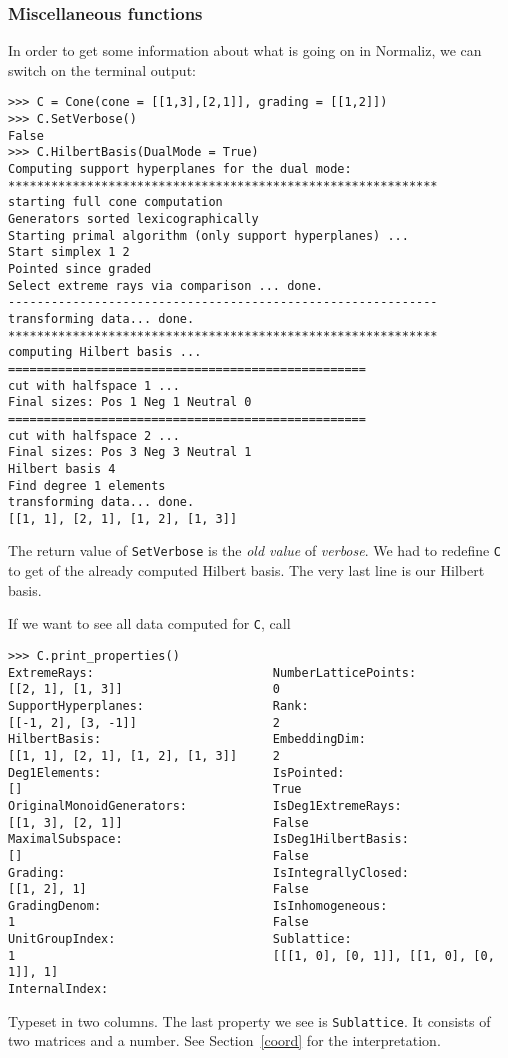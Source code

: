\begin{small}
\subsubsection{Miscellaneous functions}
In order to get some information about what is going on in Normaliz, we can switch on the terminal output:
\begin{Verbatim}
>>> C = Cone(cone = [[1,3],[2,1]], grading = [[1,2]])
>>> C.SetVerbose()
False
>>> C.HilbertBasis(DualMode = True)
Computing support hyperplanes for the dual mode:
************************************************************
starting full cone computation
Generators sorted lexicographically
Starting primal algorithm (only support hyperplanes) ...
Start simplex 1 2 
Pointed since graded
Select extreme rays via comparison ... done.
------------------------------------------------------------
transforming data... done.
************************************************************
computing Hilbert basis ...
==================================================
cut with halfspace 1 ...
Final sizes: Pos 1 Neg 1 Neutral 0
==================================================
cut with halfspace 2 ...
Final sizes: Pos 3 Neg 3 Neutral 1
Hilbert basis 4
Find degree 1 elements
transforming data... done.
[[1, 1], [2, 1], [1, 2], [1, 3]]
\end{Verbatim}
The return value of \verb|SetVerbose| is the \emph{old value} of \emph{verbose}. We had to redefine \verb|C| to get of the already computed Hilbert basis. The very last line is our Hilbert basis.

If we want to see all data computed for \verb|C|, call
\begin{Verbatim}
>>> C.print_properties()
ExtremeRays:                         NumberLatticePoints:
[[2, 1], [1, 3]]                     0
SupportHyperplanes:                  Rank:
[[-1, 2], [3, -1]]                   2
HilbertBasis:                        EmbeddingDim:
[[1, 1], [2, 1], [1, 2], [1, 3]]     2
Deg1Elements:                        IsPointed:
[]                                   True
OriginalMonoidGenerators:            IsDeg1ExtremeRays:
[[1, 3], [2, 1]]                     False
MaximalSubspace:                     IsDeg1HilbertBasis:
[]                                   False
Grading:                             IsIntegrallyClosed:
[[1, 2], 1]                          False
GradingDenom:                        IsInhomogeneous:
1                                    False
UnitGroupIndex:                      Sublattice:
1                                    [[[1, 0], [0, 1]], [[1, 0], [0, 1]], 1]
InternalIndex:
\end{Verbatim}
Typeset in two columns. The last property we see is \verb|Sublattice|. It consists of two matrices and a number. See Section~\ref{coord} for the interpretation.


\end{small}
